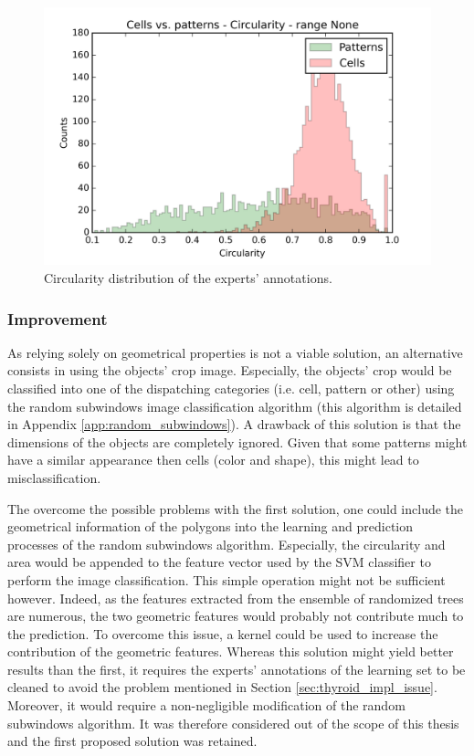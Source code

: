 \begin{figure}
	\center
	\includegraphics[scale=0.75]{image/cells_patterns_circ.png}
	\caption{Circularity distribution of the experts' annotations.}
	\label{fig:hist_circ_cell_vs_pattern}
\end{figure}


\subsubsection{Improvement}

As relying solely on geometrical properties is not a viable solution, an alternative consists in using the objects' crop image. Especially, the objects' crop would be classified into one of the dispatching categories (i.e. cell, pattern or other) using the random subwindows image classification algorithm \cite{Maree201617} (this algorithm is detailed in Appendix \ref{app:random_subwindows}). A drawback of this solution is that the dimensions of the objects are completely ignored. Given that some patterns might have a similar appearance then cells (color and shape), this might lead to misclassification. 

The overcome the possible problems with the first solution, one could include the geometrical information of the polygons into the learning and prediction processes of the random subwindows algorithm. Especially, the circularity and area would be appended to the feature vector used by the SVM classifier to perform the image classification. This simple operation might not be sufficient however. Indeed, as the features extracted from the ensemble of randomized trees are numerous, the two geometric features would probably not contribute much to the prediction. To overcome this issue, a kernel could be used to increase the contribution of the geometric features. Whereas this solution might yield better results than the first, it requires the experts' annotations of the learning set to be cleaned to avoid the problem mentioned in Section \ref{sec:thyroid_impl_issue}. Moreover, it would require a non-negligible modification of the random subwindows algorithm. It was therefore considered out of the scope of this thesis and the first proposed solution was retained.

